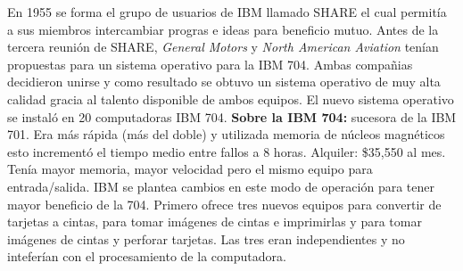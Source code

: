 En 1955 se forma el grupo de usuarios de \textsc{IBM} llamado \textsc{SHARE} el cual permitía a sus miembros intercambiar progras e ideas para beneficio mutuo. Antes de la tercera reunión de \textsc{SHARE}, \textit{General Motors} y \textit{North American Aviation} tenían propuestas para un sistema operativo para la \textsc{IBM 704}. Ambas compañias decidieron unirse y como resultado se obtuvo un sistema operativo de muy alta calidad gracia al talento disponible de ambos equipos. El nuevo sistema operativo se instaló en 20 computadoras \textsc{IBM 704}. \textbf{Sobre la \textsc{IBM 704}:} sucesora de la \textsc{IBM 701}. Era más rápida (más del doble) y utilizada memoria de núcleos magnéticos esto incrementó el tiempo medio entre fallos a 8 horas. Alquiler: \$35,550 al mes. Tenía mayor memoria, mayor velocidad pero el mismo equipo para entrada/salida. \textsc{IBM} se plantea cambios en este modo de operación para tener mayor beneficio de la 704. Primero ofrece tres nuevos equipos para convertir de tarjetas a cintas, para tomar imágenes de cintas e imprimirlas y para tomar imágenes de cintas y perforar tarjetas. Las tres eran independientes y no inteferían con el procesamiento de la computadora.\\

